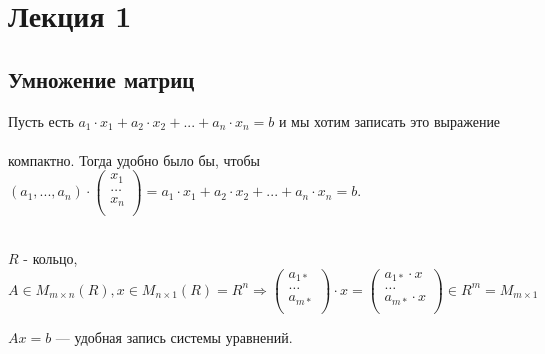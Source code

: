 \section{Лекция 1}

\subsection{Умножение матриц}
\quad
\begin{remark}
    Пусть есть $a_1 \cdot x_1 + a_2 \cdot x_2 + ... + a_n \cdot x_n = b$ и мы хотим записать это выражение \\ \\ компактно.
    Тогда удобно было бы, чтобы $(a_1, ..., a_n) \cdot 
    \begin{pmatrix}
        x_1\\
        \dots\\
        x_n\\
    \end{pmatrix} = a_1 \cdot x_1 + a_2 \cdot x_2 + ... + a_n \cdot x_n = b$.\\
\end{remark}

\begin{definition}
    \\
    $R$ - кольцо, $A \in M_{m \times n}(R), x \in M_{n \times 1}(R) = R^n \Longrightarrow
    \begin{pmatrix}
        a_{1*}\\
        \dots\\
        a_{m*}\\
    \end{pmatrix} \cdot x =   \begin{pmatrix}
        a_{1*} \cdot x\\
        \dots\\
        a_{m*} \cdot x\\
    \end{pmatrix} \in R ^ m = M_{m \times 1}$ 
\end{definition}

\quad
\begin{remark}
    $Ax = b$ --- удобная запись системы уравнений.
\end{remark}

